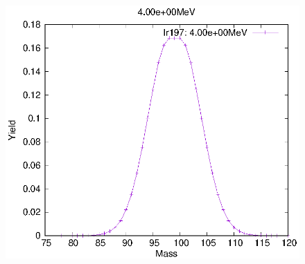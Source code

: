\begin{figure}[htbp]
\begin{minipage}{0.33\textwidth} \begin{center} \includegraphics[width=\textwidth]{YA/Ir197_4.00e+00.eps} \end{center} \end{minipage}
\end{figure}
